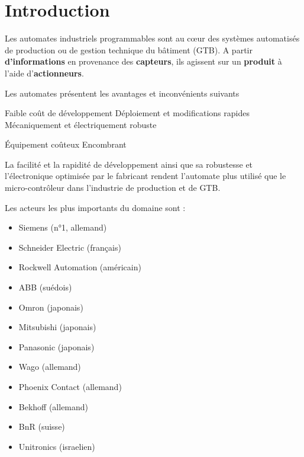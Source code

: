 \documentclass[11pt]{article}
\begin{document}
\UPSTIbuildPage


\tableofcontents
\section{Introduction}
Les automates industriels programmables sont au cœur des systèmes automatisés de production ou de gestion technique du bâtiment (GTB).
A partir \textbf{d'informations} en provenance des \textbf{capteurs}, ils agissent sur un \textbf{produit} à l'aide d'\textbf{actionneurs}.

Les automates présentent les avantages et inconvénients suivants

\begin{minipage}[t]{.49\linewidth}
	\begin{itemize}
		\itemc Faible coût de développement
		\itemc Déploiement et modifications rapides
		\itemc Mécaniquement et électriquement robuste
	\end{itemize}
\end{minipage}\hfill
\begin{minipage}[t]{.49\linewidth}
	\begin{itemize}
		\itemx Équipement coûteux
		\itemx Encombrant
	\end{itemize}
\end{minipage}

La facilité et la rapidité de développement ainsi que sa robustesse et l'électronique optimisée par le fabricant rendent l'automate plus utilisé que le micro-contrôleur dans l'industrie de production et de GTB.

Les acteurs les plus importants du domaine sont :
\begin{multicols}{2}
	\begin{itemize}
		\item Siemens (n°1, allemand)
		\item Schneider Electric (français)
		\item Rockwell Automation (américain)
		\item ABB (suédois)
		\item Omron (japonais)
		\item Mitsubishi (japonais)
		\item Panasonic (japonais)
		\item Wago (allemand)
		\item Phoenix Contact (allemand)
		\item Bekhoff (allemand)
		\item BnR (suisse)
		\item Unitronics (israelien)
	\end{itemize}
\end{multicols}




%
\end{document}
